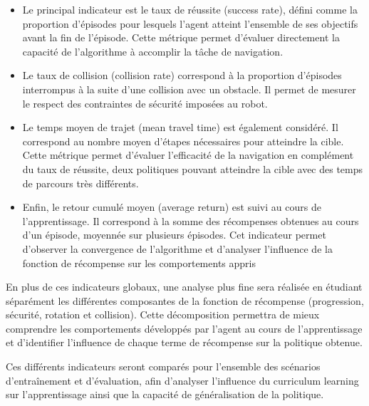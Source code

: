 \vspace{10pt}

\begin{itemize}
    \item Le principal indicateur est le taux de réussite (success rate), défini comme la proportion d'épisodes pour lesquels l'agent atteint l'ensemble de ses objectifs avant la fin de l'épisode. Cette métrique permet d'évaluer directement la capacité de l'algorithme à accomplir la tâche de navigation.

    \item Le taux de collision (collision rate) correspond à la proportion d'épisodes interrompus à la suite d'une collision avec un obstacle. Il permet de mesurer le respect des contraintes de sécurité imposées au robot.

    \item Le temps moyen de trajet (mean travel time) est également considéré. Il correspond au nombre moyen d'étapes nécessaires pour atteindre la cible. Cette métrique permet d'évaluer l'efficacité de la navigation en complément du taux de réussite, deux politiques pouvant atteindre la cible avec des temps de parcours très différents.

    \item Enfin, le retour cumulé moyen (average return) est suivi au cours de l'apprentissage. Il correspond à la somme des récompenses obtenues au cours d'un épisode, moyennée sur plusieurs épisodes. Cet indicateur permet d'observer la convergence de l'algorithme et d'analyser l'influence de la fonction de récompense sur les comportements appris
\end{itemize}

\vspace{10pt}

\noindent En plus de ces indicateurs globaux, une analyse plus fine sera réalisée en étudiant séparément les différentes composantes de la fonction de récompense (progression, sécurité, rotation et collision). Cette décomposition permettra de mieux comprendre les comportements développés par l'agent au cours de l'apprentissage et d'identifier l'influence de chaque terme de récompense sur la politique obtenue.

\vspace{10pt}

\noindent Ces différents indicateurs seront comparés pour l'ensemble des scénarios d'entraînement et d'évaluation, afin d'analyser l'influence du curriculum learning sur l'apprentissage ainsi que la capacité de généralisation de la politique.

